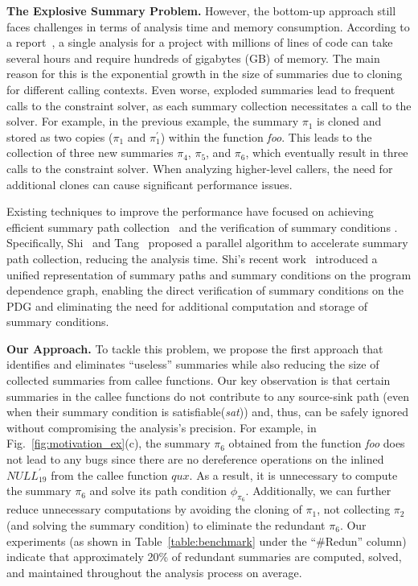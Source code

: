 \textbf{The Explosive Summary Problem.}
However, the bottom-up approach still faces challenges in terms of analysis time and memory consumption. 
According to a report~\cite{shi2018pinpoint}, a single analysis for a project with millions of lines of code can take several hours and require hundreds of gigabytes (GB) of memory. 
The main reason for this is the exponential growth in the size of summaries due to cloning for different calling contexts.
Even worse, exploded summaries lead to frequent calls to the constraint solver, as each summary collection necessitates a call to the solver.
For example, in the previous example, the summary $\pi_1$ is cloned and stored as two copies ($\pi_1$ and $\pi^{\prime}_{1}$) within the function \textit{foo}.
This leads to the collection of three new summaries $\pi_4$, $\pi_5$, and $\pi_6$, which eventually result in three calls to the constraint solver.
When analyzing higher-level callers, the need for additional clones can cause significant performance issues.


Existing techniques to improve the performance have focused on achieving efficient summary path collection~\cite{shi2020pipelining, tang2023Scaling} and the verification of summary conditions \cite{shi2021path}.
Specifically, Shi~\cite{shi2020pipelining} and Tang~\cite{tang2023Scaling} proposed a parallel algorithm to accelerate summary path collection, reducing the analysis time. 
Shi's recent work~\cite{shi2021path} introduced a unified representation of summary paths and summary conditions on the program dependence graph, enabling the direct verification of summary conditions on the PDG and eliminating the need for additional computation and storage of summary conditions.

\textbf{Our Approach.}
To tackle this problem, we propose the first approach that identifies and eliminates ``useless'' summaries while also reducing the size of collected summaries from callee functions.
Our key observation is that certain summaries in the callee functions do not contribute to any source-sink path (even when their summary condition is satisfiable(\textit{sat})) and, thus, can be safely ignored without compromising the analysis's precision.
For example, in Fig.~\ref{fig:motivation_ex}(c), the summary $\pi_6$ obtained from the function \textit{foo} does not lead to any bugs since there are no dereference operations on the inlined $NULL_{19}^{'}$ from the callee function $qux$. 
As a result, it is unnecessary to compute the summary $\pi_6$ and solve its path condition $\phi_{\pi_6}$.
Additionally, we can further reduce unnecessary computations by avoiding the cloning of $\pi_1$, not collecting $\pi_2$ (and solving the summary condition) to eliminate the redundant $\pi_6$.
Our experiments (as shown in Table~\ref{table:benchmark} under the ``\#Redun'' column) indicate that approximately 20\% of redundant summaries are computed, solved, and maintained throughout the analysis process on average.

